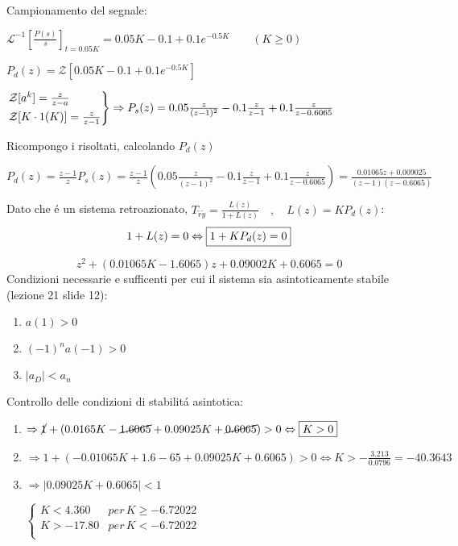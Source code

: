 \documentclass{article}
\begin{document}
\bigbreak
Campionamento del segnale:

$ \mathcal{L}^{-1}\left[\frac{P(s)}{s}\right]_{t=0.05K} = 0.05K - 0.1 + 0.1 e^{-0.5K} \qquad (K\ge 0) $

\bigbreak
$ P_d(z) = \mathcal{Z}\left[ 0.05K - 0.1 + 0.1 e^{-0.5K} \right] $

\bigbreak
$
    \begin{rcases}
        \mathcal{Z}[a^k] = \frac{z}{z-a}\\
        \mathcal{Z}[K\cdot1(K)] = \frac{z}{z-1}
    \end{rcases} \Rightarrow P_s(z) = 0.05\frac{z}{(z-1)^2} -0.1 \frac{z}{z-1} + 0.1\frac{z}{z-0.6065}
$

\bigbreak
Ricompongo i risoltati, calcolando $P_d(z)$

$P_d(z) = \frac{z-1}{z}P_s(z) = \frac{z-1}{z} \left( 0.05 \frac{z}{(z-1)^2} - 0.1\frac{z}{z-1} + 0.1 \frac{z}{z-0.6065}\right) =
\frac{0.01065 z + 0.009025}{(z-1)(z-0.6065)} $

\bigbreak
Dato che \'e un sistema retroazionato, $T_{\tilde{r}\tilde{y}} = \frac{L(z)}{1 + L(z)} \quad, \quad L(z) = KP_d(z)$:
\[ 1 + L(z) = 0 \Leftrightarrow \framebox{$1 + KP_d(z) = 0$}\]

\[ z^2 + (0.01065K - 1.6065)z + 0.09002K + 0.6065 = 0 \]
\bigbreak
Condizioni necessarie e sufficenti per cui il sistema sia asintoticamente stabile (lezione 21 slide 12):
\begin{enumerate}
    \item $a(1) > 0$
    \item $(-1)^n a(-1) > 0$
    \item $|a_D| < a_n$
\end{enumerate}

\bigbreak
Controllo delle condizioni di stabilit\'a asintotica:
\begin{enumerate}
    \item $\Rightarrow \cancel{1} + (0.0165K - \cancel{1.6065} + 0.09025K + \cancel{0.6065}) > 0 \Leftrightarrow \framebox{$K>0$}$
    \item $\Rightarrow 1 + (-0.01065K + 1.6-65 + 0.09025K + 0.6065) > 0 \Leftrightarrow K>-\frac{3.213}{0.0796} = -40.3643 $
    \item $\Rightarrow | 0.09025K + 0.6065| < 1 $

        $
        \begin{cases}
            K < 4.360  &per \, K \ge -6.72022\\
            K > -17.80  &per \, K < -6.72022\\
        \end{cases}
        $
\end{enumerate}
\end{document}
